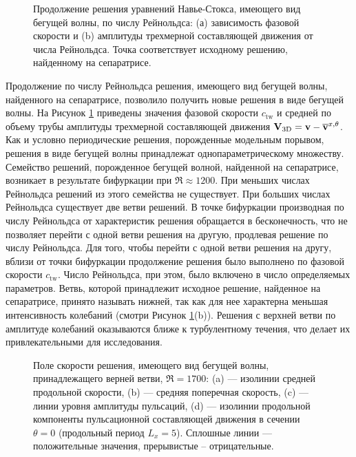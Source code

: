 \begin{figure}
\caption{Продолжение решения уравнений Навье-Стокса, имеющего вид бегущей волны, по числу Рейнольдса: (а) зависимость фазовой скорости и (b) амплитуды трехмерной составляющей движения от числа Рейнольдса. Точка соответствует исходному решению, найденному на сепаратрисе.} 
\label{pipeTW_contin_pic}
\end{figure}

Продолжение по числу Рейнольдса решения, имеющего вид бегущей волны, найденного на сепаратрисе, позволило получить новые решения в виде бегущей волны. На Рисунок \ref{pipeTW_contin_pic} приведены значения фазовой скорости $c_\mathrm{tw}$ и средней по объему трубы амплитуды трехмерной составляющей движения $\mathbf{V}_\mathrm{3D} = \mathbf{v} - \overline{\mathbf{v}}^{x,\theta}$. Как и условно периодические решения, порожденные модельным порывом, решения в виде бегущей волны принадлежат однопараметрическому множеству. Семейство решений, порожденное бегущей волной, найденной на сепаратрисе, возникает в результате бифуркации при $\Re \approx 1200$. При меньших числах Рейнольдса решений из этого семейства не существует. При больших числах Рейнольдса существует две ветви решений. В точке бифуркации производная по числу Рейнольдса от характеристик решения обращается в бесконечность, что не позволяет перейти с одной ветви решения на другую, продлевая решение по числу Рейнольдса. Для того, чтобы перейти с одной ветви решения на другу, вблизи от точки бифуркации продолжение решения было выполнено по фазовой скорости $c_\mathrm{tw}$. Число Рейнольдса, при этом, было включено в число определяемых параметров. Ветвь, которой принадлежит исходное решение, найденное на сепаратрисе, принято называть нижней, так как для нее характерна меньшая интенсивность колебаний (смотри Рисунок \ref{pipeTW_contin_pic}(b)). Решения с верхней ветви по амплитуде колебаний оказываются ближе к турбулентному течения, что делает их привлекательными для исследования. 

\begin{figure}
\caption{Поле скорости решения, имеющего вид бегущей волны, принадлежащего верней ветви, $\Re = 1700$: (a) --- изолинии средней продольной скорости, (b) --- средняя поперечная скорость, (c) --- линии уровня амплитуды пульсаций, (d) --- изолинии продольной компоненты пульсационной составляющей движения в сечении $\theta = 0$ (продольный период $L_x = 5$). Сплошные линии --- положительные значения, прерывистые -- отрицательные. } 
\label{pipeTWub_means_pic}
\end{figure}


